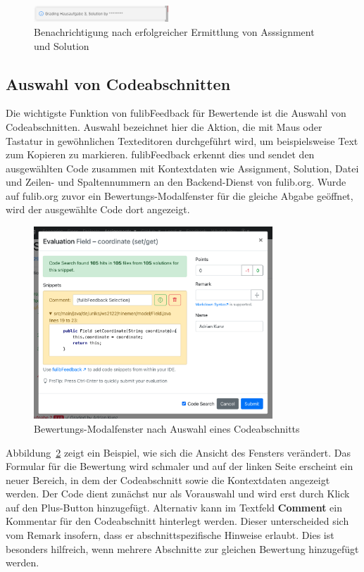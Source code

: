 \begin{figure}[h]
    \centering
    \includegraphics[width=0.45\textwidth]{images/fulibFeedback-notification}
    \caption{Benachrichtigung nach erfolgreicher Ermittlung von Asssignment und Solution}
    \label{fig:fulibFeedback-notification}
\end{figure}

\subsection{Auswahl von Codeabschnitten}\label{subsec:choosing-code-snippets}

Die wichtigste Funktion von fulibFeedback für Bewertende ist die Auswahl von Codeabschnitten.
Auswahl bezeichnet hier die Aktion, die mit Maus oder Tastatur in gewöhnlichen Texteditoren durchgeführt wird, um beispielsweise Text zum Kopieren zu markieren.
fulibFeedback erkennt dies und sendet den ausgewählten Code zusammen mit Kontextdaten wie Assignment, Solution, Datei und Zeilen- und Spaltennummern an den Backend-Dienst von fulib.org.
Wurde auf fulib.org zuvor ein Bewertungs-Modalfenster für die gleiche Abgabe geöffnet, wird der ausgewählte Code dort angezeigt.

\begin{figure}
    \centering
    \includegraphics[width=0.8\textwidth]{images/fulibFeedback-snippet-good}
    \caption{Bewertungs-Modalfenster nach Auswahl eines Codeabschnitts}
    \label{fig:fulibFeedback-snippet-good}
\end{figure}

Abbildung~\ref{fig:fulibFeedback-snippet-good} zeigt ein Beispiel, wie sich die Ansicht des Fensters verändert.
Das Formular für die Bewertung wird schmaler und auf der linken Seite erscheint ein neuer Bereich, in dem der Codeabschnitt sowie die Kontextdaten angezeigt werden.
Der Code dient zunächst nur als Vorauswahl und wird erst durch Klick auf den Plus-Button hinzugefügt.
Alternativ kann im Textfeld \textbf{Comment} ein Kommentar für den Codeabschnitt hinterlegt werden.
Dieser unterscheided sich vom Remark insofern, dass er abschnittspezifische Hinweise erlaubt.
Dies ist besonders hilfreich, wenn mehrere Abschnitte zur gleichen Bewertung hinzugefügt werden.

